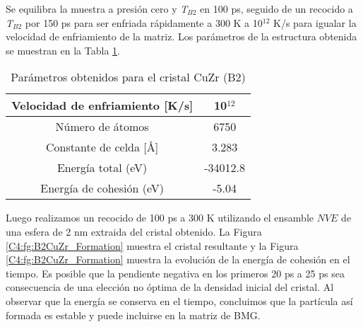 Se equilibra la muestra a presión cero y \textit{T$_{B2}$} en 100 ps, seguido de un recocido a \textit{T$_{B2}$} por 150 ps para ser enfriada rápidamente a 300 K a 10$^{12}$ K/s para igualar la velocidad de enfriamiento de la matriz. Los parámetros de la estructura obtenida se muestran en la Tabla \ref{C4:tb:b2CrystalParameters}.

\begin{table}[htp]
\caption{Parámetros obtenidos para el cristal CuZr (B2)}
\begin{center}
\begin{tabular}{*{2}{c}}
\hline
Velocidad de enfriamiento [K/s] & 10$^{12}$ \\
\hline
Número de átomos & 6750 \\
\hline
Constante de celda [\AA] & 3.283 \\
\hline
Energía total (eV) & -34012.8 \\
\hline
Energía de cohesión (eV) & -5.04 \\
\hline
\end{tabular}
\end{center}
\label{C4:tb:b2CrystalParameters}
\end{table}

Luego realizamos un recocido de 100 ps a 300 K utilizando el ensamble $NVE$ de una esfera de 2 nm extraida del cristal obtenido. La Figura \ref{C4:fg:B2CuZr_Formation}  muestra el cristal resultante y la Figura \ref{C4:fg:B2CuZr_Formation}  muestra la evolución de la energía de cohesión en el tiempo. Es posible que la pendiente negativa en los primeros 20 ps a 25 ps sea consecuencia de una elección no óptima de la densidad inicial del cristal. Al observar que la energía se conserva en el tiempo, concluimos que la partícula así formada es estable y puede incluirse en la matriz de BMG.

